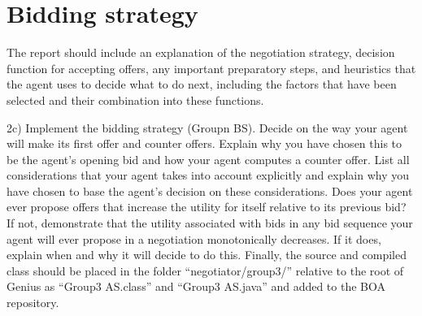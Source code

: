 \section{Bidding strategy}

The report should include an explanation of the negotiation strategy, decision function for accepting offers, any important preparatory steps, and heuristics that the agent uses to decide what to do next, including the factors that have been selected and their combination into these functions.

2c) Implement the bidding strategy (Groupn BS). Decide on the way your agent will make its
first offer and counter offers. Explain why you have chosen this to be the agent’s opening bid
and how your agent computes a counter offer. List all considerations that your agent takes
into account explicitly and explain why you have chosen to base the agent’s decision on these
considerations.
Does your agent ever propose offers that increase the utility for itself relative to its previous
bid? If not, demonstrate that the utility associated with bids in any bid sequence your agent
will ever propose in a negotiation monotonically decreases. If it does, explain when and why it
will decide to do this.
Finally, the source and compiled class should be placed in the folder “negotiator/group3/” relative
to the root of Genius as “Group3 AS.class” and “Group3 AS.java” and added to the BOA
repository.